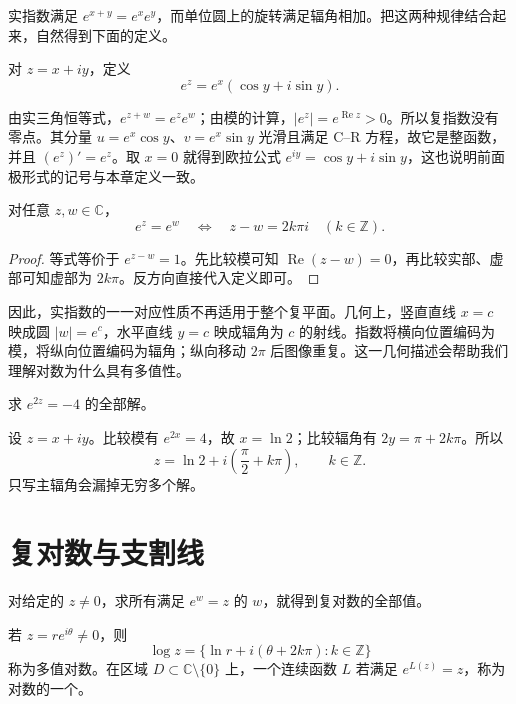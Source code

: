 \documentclass[UTF8,12pt,a4paper,fontset=fandol]{ctexbook}
\begin{document}
实指数满足 $e^{x+y}=e^xe^y$，而单位圆上的旋转满足辐角相加。把这两种规律结合起来，自然得到下面的定义。

\begin{definition}[复指数函数]
对 $z=x+iy$，定义
\begin{equation}
 e^z=e^x(\cos y+i\sin y).
 \label{eq:cv-exp}
\end{equation}
\end{definition}

由实三角恒等式，$e^{z+w}=e^ze^w$；由模的计算，$|e^z|=e^{\operatorname{Re}z}>0$。所以复指数没有零点。其分量 $u=e^x\cos y$、$v=e^x\sin y$ 光滑且满足 C--R 方程，故它是整函数，并且 $(e^z)'=e^z$。取 $x=0$ 就得到欧拉公式 $e^{iy}=\cos y+i\sin y$，这也说明前面极形式的记号与本章定义一致。

\begin{proposition}[复指数的周期与相等条件]
对任意 $z,w\in\mathbb C$，
\[
 e^z=e^w\quad\Longleftrightarrow\quad z-w=2k\pi i\quad(k\in\mathbb Z).
\]
\end{proposition}
\begin{proof}
等式等价于 $e^{z-w}=1$。先比较模可知 $\operatorname{Re}(z-w)=0$，再比较实部、虚部可知虚部为 $2k\pi$。反方向直接代入定义即可。
\end{proof}

因此，实指数的一一对应性质不再适用于整个复平面。几何上，竖直直线 $x=c$ 映成圆 $|w|=e^c$，水平直线 $y=c$ 映成辐角为 $c$ 的射线。指数将横向位置编码为模，将纵向位置编码为辐角；纵向移动 $2\pi$ 后图像重复。这一几何描述会帮助我们理解对数为什么具有多值性。

\begin{example}[解指数方程]
求 $e^{2z}=-4$ 的全部解。
\end{example}
\begin{solve}
设 $z=x+iy$。比较模有 $e^{2x}=4$，故 $x=\ln2$；比较辐角有 $2y=\pi+2k\pi$。所以
\[
 z=\ln2+i\left(\frac\pi2+k\pi\right),\qquad k\in\mathbb Z.
\]
只写主辐角会漏掉无穷多个解。
\end{solve}

\section{复对数与支割线}

对给定的 $z\ne0$，求所有满足 $e^w=z$ 的 $w$，就得到复对数的全部值。

\begin{definition}[多值对数与对数分支]
若 $z=re^{i\theta}\ne0$，则
\[
 \log z=\{\ln r+i(\theta+2k\pi):k\in\mathbb Z\}
\]
称为多值对数。在区域 $D\subset\mathbb C\setminus\{0\}$ 上，一个连续函数 $L$ 若满足 $e^{L(z)}=z$，称为对数的一个。
\end{definition}
\end{document}
